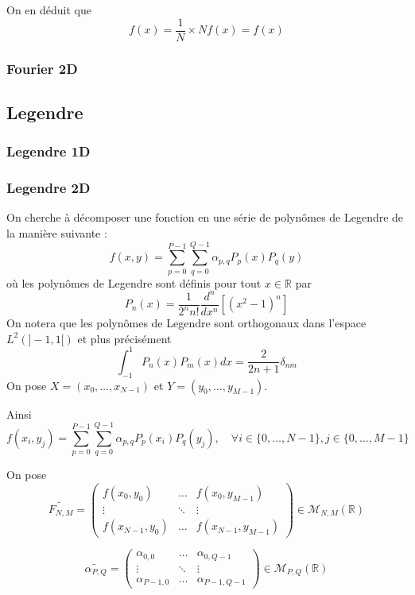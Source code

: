 On en déduit que
$$f(x)=\frac{1}{N}\times Nf(x)=f(x)$$

\subsubsection*{Fourier 2D}

\subsection{Legendre}

\subsubsection*{Legendre 1D}

\subsubsection*{Legendre 2D}

On cherche à décomposer une fonction en une série de polynômes de Legendre de la manière suivante :
\begin{equation}
	f(x,y)=\sum_{p=0}^{P-1}\sum_{q=0}^{Q-1}\alpha_{p,q}P_p(x)P_q(y)
	\label{decomp}
\end{equation}
où les polynômes de Legendre sont définis pour tout $x\in\mathbb{R}$ par
$$P_n(x)=\frac{1}{2^n n!}\frac{d^n}{dx^n}[(x^2-1)^n]$$
On notera que les polynômes de Legendre sont orthogonaux dans l'espace $L^2(]-1,1[)$ et plus précisément
\begin{equation}
	\int_{-1}^1 P_n(x)P_m(x)dx=\frac{2}{2n+1}\delta_{nm} 
	\label{ortho}
\end{equation}
On pose $X=(x_0,\dots,x_{N-1})$ et $Y=(y_0,\dots,y_{M-1})$.

Ainsi
$$f(x_i,y_j)=\sum_{p=0}^{P-1}\sum_{q=0}^{Q-1}\alpha_{p,q}P_p(x_i)P_q(y_j), \quad \forall i\in\{0,\dots,N-1\},j\in\{0,\dots,M-1\}$$

On pose
$$\widetilde{F_{N,M}}=\begin{pmatrix}
	f(x_0,y_0) & \dots & f(x_0,y_{M-1}) \\
	\vdots & \ddots & \vdots \\
	f(x_{N-1},y_0) & \dots & f(x_{N-1},y_{M-1})
\end{pmatrix}\in\mathcal{M}_{N,M}(\mathbb{R})$$

$$\widetilde{\alpha_{P,Q}}=\begin{pmatrix}
	\alpha_{0,0} & \dots & \alpha_{0,Q-1} \\
	\vdots & \ddots & \vdots \\
	\alpha_{P-1,0} & \dots & \alpha_{P-1,Q-1}
\end{pmatrix}\in\mathcal{M}_{P,Q}(\mathbb{R})$$

